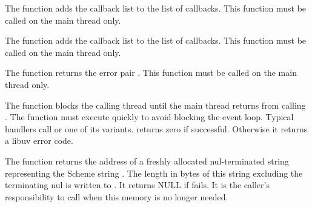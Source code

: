 The  function adds the callback list
 to the list of
callbacks. This function must be called on the main thread only.

\begin{function}
\end{function}

The  function adds the callback list
 to the list
of callbacks. This function must be called on the main thread only.

\begin{function}
\end{function}

The  function returns the error pair
. This function must be called on the
main thread only.

\begin{function}
\end{function}

The  function blocks the calling thread until
the main thread returns from calling .
The  function must execute quickly to avoid blocking the
event loop.
Typical handlers call  or one of its variants.
 returns zero if successful.
Otherwise it returns a libuv error code.

\begin{function}
\end{function}

The  function returns the address of a
freshly allocated nul-terminated string representing the Scheme string
. The length in bytes of this string excluding the terminating
nul is written to . It returns NULL if
 fails. It is the caller's responsibility to call
 when this memory is no longer needed.

